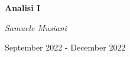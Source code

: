 \thispagestyle{empty}

\begin{center}
	\vfill
    \vspace*{0.3\textheight}

	\Huge
	\textbf{Analisi I}
	
	\vspace{1cm}
	
	\Large
	\textit{Samuele Musiani}
	
	\vspace{3cm}
	
	\large
	September 2022 - December 2022
	
    \normalsize
    
\end{center}

